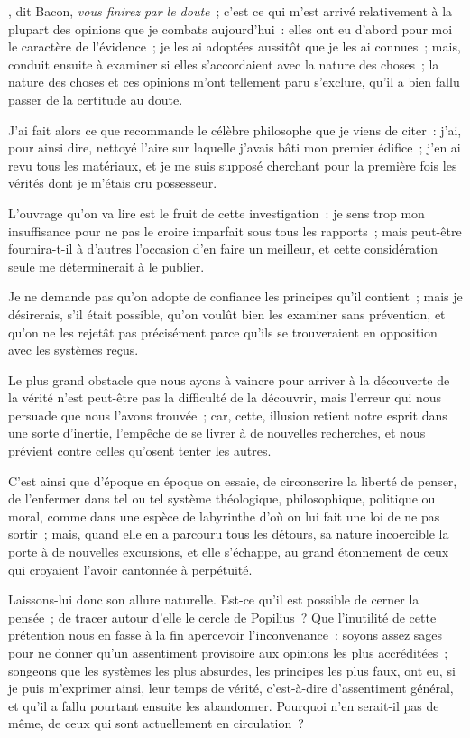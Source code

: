 \documentclass[french,twoside]{book} %
\begin{document}
, dit Bacon, {\itshape vous finirez par le doute} ; c’est ce qui m’est arrivé relativement à la plupart des opinions que je combats aujourd’hui : elles ont eu d’abord pour moi le caractère de l’évidence ; je les ai adoptées aussitôt que je les ai connues ; mais, conduit ensuite à examiner si elles s’accordaient avec la nature des choses ; la nature des choses et ces opinions m’ont tellement paru s’exclure, qu’il a bien fallu passer de la certitude au doute.\par
J’ai fait alors ce que recommande le célèbre philosophe que je viens de citer : j’ai, pour ainsi dire, nettoyé l’aire sur laquelle j’avais bâti mon premier édifice ; j’en ai revu tous les matériaux, et je me suis supposé cherchant pour la première fois les vérités dont je m’étais cru possesseur.\par
L’ouvrage qu’on va lire est le fruit de cette investigation : je sens trop mon insuffisance pour ne pas le croire imparfait sous tous les rapports ; mais peut-être fournira-t-il à d’autres l’occasion d’en faire un meilleur, et cette considération seule me déterminerait à le publier.\par
Je ne demande pas qu’on adopte de confiance les principes qu’il contient ; mais je désirerais, s’il était possible, qu’on voulût bien les examiner sans prévention, et qu’on ne les rejetât pas précisément parce qu’ils se trouveraient en opposition avec les systèmes reçus.\par
Le plus grand obstacle que nous ayons à vaincre pour arriver à la découverte de la vérité n’est peut-être pas la difficulté de la découvrir, mais l’erreur qui nous persuade que nous l’avons trouvée ; car, cette, illusion retient notre esprit dans une sorte d’inertie, l’empêche de se livrer à de nouvelles recherches, et nous prévient contre celles qu’osent tenter les autres.\par
C’est ainsi que d’époque en époque on essaie, de circonscrire la liberté de penser, de l’enfermer dans tel ou tel système théologique, philosophique, politique ou moral, comme dans une espèce de labyrinthe d’où on lui fait une loi de ne pas sortir ; mais, quand elle en a parcouru tous les détours, sa nature incoercible la porte à de nouvelles excursions, et elle s’échappe, au grand étonnement de ceux qui croyaient l’avoir cantonnée à perpétuité.\par
Laissons-lui donc son allure naturelle. Est-ce qu’il est possible de cerner la pensée ; de tracer autour d’elle le cercle de Popilius ? Que l’inutilité de cette prétention nous en fasse à la fin apercevoir l’inconvenance : soyons assez sages pour ne donner qu’un assentiment provisoire aux opinions les plus accréditées ; songeons que les systèmes les plus absurdes, les principes les plus faux, ont eu, si je puis m’exprimer ainsi, leur temps de vérité, c’est-à-dire d’assentiment général, et qu’il a fallu pourtant ensuite les abandonner. Pourquoi n’en serait-il pas de même, de ceux qui sont actuellement en circulation ?\par
\end{document}
